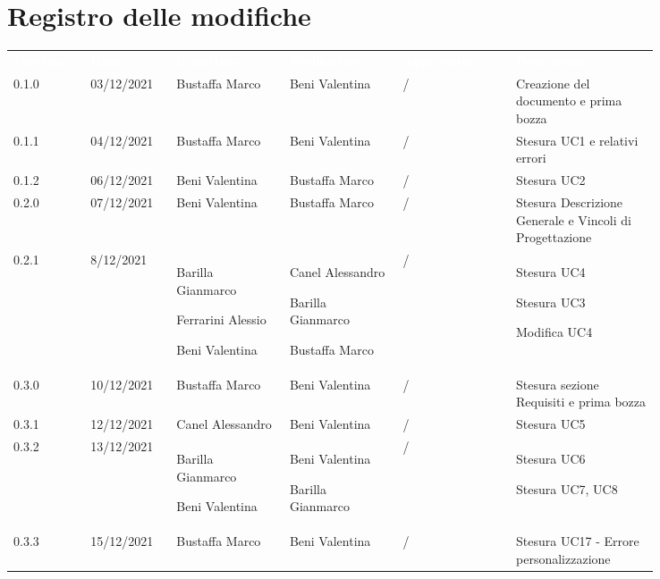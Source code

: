 \section*{Registro delle modifiche}

{\renewcommand{\arraystretch}{1.5}
\scriptsize
\begin{tabular}{p{0.10\linewidth}p{0.10\linewidth}p{0.15\linewidth}p{0.15\linewidth}p{0.15\linewidth}p{0.19\linewidth}}
	\rowcolor[RGB]{33, 73, 50}
	\textcolor{white}{\textbf{Versione}} & \textcolor{white}{\textbf{Data}} &
	\textcolor{white}{\textbf{Redattore}} & \textcolor{white}{\textbf{Verificatore}} &
	\textcolor{white}{\textbf{Approvatore}} & \textcolor{white}{\textbf{Descrizione}}\\
	\rowcolor[RGB]{216, 235, 171}
	0.1.0 & 03/12/2021 & Bustaffa Marco& Beni Valentina &/& Creazione del documento e prima bozza\\
	\rowcolor[RGB]{233, 245, 206}
	0.1.1 & 04/12/2021 & Bustaffa Marco& Beni Valentina &/& Stesura UC1 e relativi errori\\
	\rowcolor[RGB]{216, 235, 171}
	0.1.2 & 06/12/2021 & Beni Valentina& Bustaffa Marco &/& Stesura UC2\\
	\rowcolor[RGB]{233, 245, 206}
	0.2.0 & 07/12/2021 & Beni Valentina& Bustaffa Marco &/& Stesura Descrizione Generale e Vincoli di Progettazione\\
	\rowcolor[RGB]{216, 235, 171}
	0.2.1 & 8/12/2021 & Barilla Gianmarco \par Ferrarini Alessio \par Beni Valentina& Canel Alessandro \par Barilla Gianmarco \par Bustaffa Marco&/& Stesura UC4 \par Stesura UC3 \par Modifica UC4 \\
	\rowcolor[RGB]{233, 245, 206}
	0.3.0 & 10/12/2021 & Bustaffa Marco& Beni Valentina &/& Stesura sezione Requisiti e prima bozza\\
	\rowcolor[RGB]{216, 235, 171}
	0.3.1 & 12/12/2021 & Canel Alessandro& Beni Valentina &/& Stesura UC5\\
	\rowcolor[RGB]{233, 245, 206}
	0.3.2 & 13/12/2021 & Barilla Gianmarco \par Beni Valentina& Beni Valentina \par Barilla Gianmarco &/& Stesura UC6 \par Stesura UC7, UC8\\
	\rowcolor[RGB]{216, 235, 171}
	0.3.3 & 15/12/2021 & Bustaffa Marco& Beni Valentina &/& Stesura UC17 - Errore personalizzazione\\

\end{tabular}}
